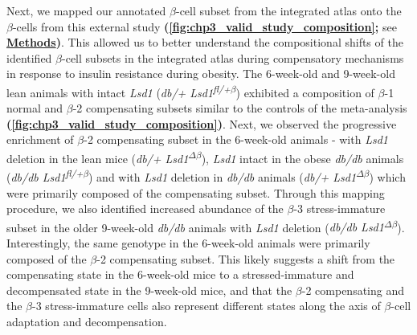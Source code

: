 Next, we mapped our annotated $\beta$-cell subset from the integrated atlas onto the $\beta$-cells from this external study \textbf{(\autoref{fig:chp3_valid_study_composition};} see \hyperref[subsubsec:met_chp3_validation]{\textbf{Methods}}\textbf{)}. This allowed us to better understand the compositional shifts of the identified $\beta$-cell subsets in the integrated atlas during compensatory mechanisms in response to insulin resistance during obesity. The 6-week-old and 9-week-old lean animals with intact \textit{Lsd1} (\textit{db/+ Lsd1\textsuperscript{fl/+$\beta$}}) exhibited a composition of $\beta$-1 normal and $\beta$-2 compensating subsets similar to the controls of the meta-analysis \textbf{(\autoref{fig:chp3_valid_study_composition})}. Next, we observed the progressive enrichment of $\beta$-2 compensating subset in the 6-week-old animals - with \textit{Lsd1} deletion in the lean mice (\textit{db/+ Lsd1\textsuperscript{$\Delta\beta$}}), \textit{Lsd1} intact in the obese \textit{db/db} animals (\textit{db/db Lsd1\textsuperscript{fl/+$\beta$}})  and with \textit{Lsd1} deletion in \textit{db/db} animals (\textit{db/+ Lsd1\textsuperscript{$\Delta\beta$}})  which were primarily composed of the compensating subset. Through this mapping procedure, we also identified increased abundance of the $\beta$-3 stress-immature subset in the older 9-week-old \textit{db/db} animals with \textit{Lsd1} deletion (\textit{db/db Lsd1\textsuperscript{$\Delta\beta$}}). Interestingly, the same genotype in the 6-week-old animals were primarily composed of the $\beta$-2 compensating subset. This likely suggests a shift from the compensating state in the 6-week-old mice to a stressed-immature and decompensated state in the 9-week-old mice, and that the $\beta$-2 compensating and the $\beta$-3 stress-immature cells also represent different states along the axis of $\beta$-cell adaptation and decompensation.



